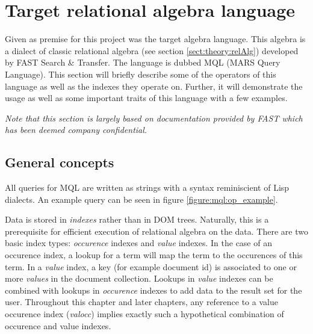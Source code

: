 \section{Target relational algebra language}
\label{sect:method:mql}
Given as premise for this project was the target algebra language. This
algebra is a dialect of classic relational algebra (see section
\ref{sect:theory:relAlg}) developed by FAST Search \& Transfer. The language
is dubbed MQL (MARS Query Language). This section will briefly describe some of the operators
of this language as well as the indexes they operate on. Further, it will demonstrate
the usage as well as some important traits of this language with a few
examples.

\emph{Note that this section is largely based on documentation provided by FAST which
has been deemed company confidential. }

\subsection{General concepts}
\label{sect:method:mql:indexes}
\label{sect:method:mql:concepts}
All queries for MQL are written as strings with a syntax reminiscient of Lisp
dialects. An example query can be seen in figure \ref{figure:mql:op_example}.

Data is stored in \textit{indexes} rather than in DOM trees. Naturally, this is a prerequisite for efficient
execution of relational algebra on the data. There are two basic index types: \textit{occurence} indexes and
\textit{value} indexes. In the case of an occurence index, a lookup for a term will map the term to the occurences
of this term. In a \textit{value} index, a key (for example document id) is associated to one or more
\textit{values} in the document collection. Lookups in \textit{value} indexes can be combined with lookups in
\textit{occurence} indexes to add data to the result set for the user.
Throughout this chapter and later chapters, any reference to a value occurence index (\textit{valocc})
implies exactly such a hypothetical combination of occurence and value indexes.

